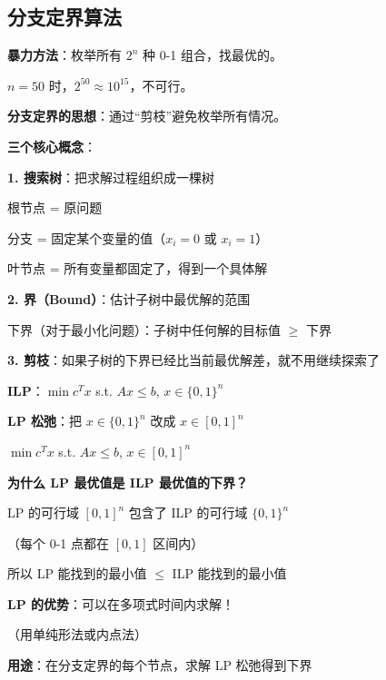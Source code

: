 \documentclass[12pt, a4paper]{ctexart}
\begin{document}
\subsection{分支定界算法}

\begin{blackboard}[分支定界的核心思想]

\textbf{暴力方法}：枚举所有 $2^n$ 种 0-1 组合，找最优的。

$n = 50$ 时，$2^{50} \approx 10^{15}$，不可行。

\textbf{分支定界的思想}：通过``剪枝''避免枚举所有情况。

\textbf{三个核心概念}：

\textbf{1. 搜索树}：把求解过程组织成一棵树

根节点 = 原问题

分支 = 固定某个变量的值（$x_i = 0$ 或 $x_i = 1$）

叶节点 = 所有变量都固定了，得到一个具体解

\textbf{2. 界（Bound）}：估计子树中最优解的范围

下界（对于最小化问题）：子树中任何解的目标值 $\geq$ 下界

\textbf{3. 剪枝}：如果子树的下界已经比当前最优解差，就不用继续探索了

\end{blackboard}

\begin{blackboard}[LP 松弛：计算下界的方法]

\textbf{ILP}：$\min c^T x$ \quad s.t. \quad $Ax \leq b$, \quad $x \in \{0, 1\}^n$

\textbf{LP 松弛}：把 $x \in \{0, 1\}^n$ 改成 $x \in [0, 1]^n$

$\min c^T x$ \quad s.t. \quad $Ax \leq b$, \quad $x \in [0, 1]^n$

\textbf{为什么 LP 最优值是 ILP 最优值的下界？}

LP 的可行域 $[0,1]^n$ 包含了 ILP 的可行域 $\{0,1\}^n$

（每个 0-1 点都在 $[0,1]$ 区间内）

所以 LP 能找到的最小值 $\leq$ ILP 能找到的最小值

\textbf{LP 的优势}：可以在多项式时间内求解！

（用单纯形法或内点法）

\textbf{用途}：在分支定界的每个节点，求解 LP 松弛得到下界

\end{blackboard}
\end{document}
